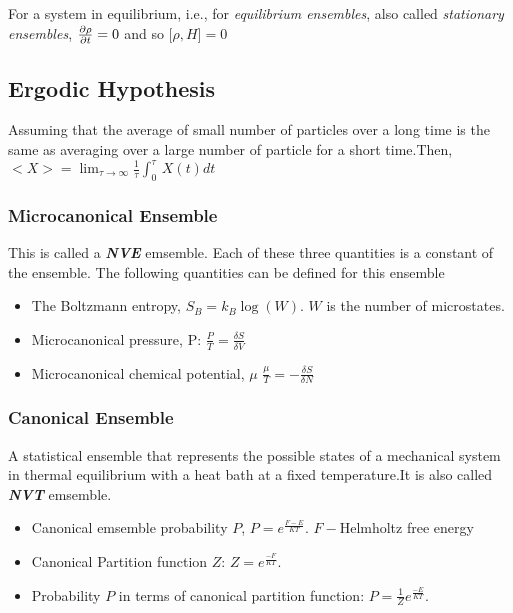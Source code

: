 \documentclass[]{article}
\begin{document}
For a system in equilibrium, i.e., for \emph{equilibrium ensembles}, also called \emph{stationary ensembles}, 
$\partialderivative{\rho}{t} = 0$
and so 
$\big[\rho,H\big] = 0$

\subsection{Ergodic Hypothesis}
Assuming that the average of small number of particles over a long time is the same as averaging over a large number of particle for a short time.Then, $ <X>=\lim_{\tau\to\infty}  \frac{1}{\tau}\int_{0}^{\tau}\,X(t)dt$ 

\subsubsection{Microcanonical Ensemble}
This is called a \textbf{\textit{NVE}} emsemble. Each of these three quantities is a constant of the ensemble. The following quantities can be defined for this ensemble

\begin{itemize}
    \item The Boltzmann entropy, $S_B= k_B\log(W)$. $W$ is the number of microstates.
    \item  Microcanonical pressure, P: $\frac{P}{T}=\frac{\delta S}{\delta V}$
     \item  Microcanonical chemical potential, $\mu$ $\frac{\mu}{T}=-\frac{\delta S}{\delta N}$
\end{itemize}  



\subsubsection{Canonical Ensemble}
A statistical ensemble that represents the possible states of a mechanical system in thermal equilibrium with a heat bath at a fixed temperature.It is also called \textbf{\textit{NVT}} emsemble.
\begin{itemize}
    \item Canonical emsemble probability $P$, $P= e^{\frac{F-E}{KT}}$. $F-$Helmholtz free energy
      \item  Canonical Partition function $Z$: $Z= e^{\frac{-F}{KT}}$.
    \item  Probability $P$ in terms of  canonical partition function: $P= \frac{1}{Z}e^{\frac{-E}{KT}}$.
    
\end{itemize}  
\end{document}
